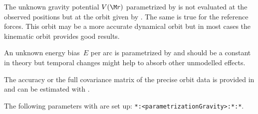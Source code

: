 The unknown gravity potential $V(\M r)$ parametrized by 
is not evaluated at the observed positions but at the orbit given by .
The same is true for the reference forces. This orbit may be a more accurate dynamical orbit but
in most cases the kinematic orbit provides good results.

An unknown energy bias~$E$ per arc is parametrized by 
and should be a constant in theory but temporal changes might help to absorb other unmodelled effects.

The accuracy or the full covariance matrix of the precise orbit data is provided in
 and can be estimated with .

The following parameters with  are set up:
\verb|*:<parametrizationGravity>:*:*|.


